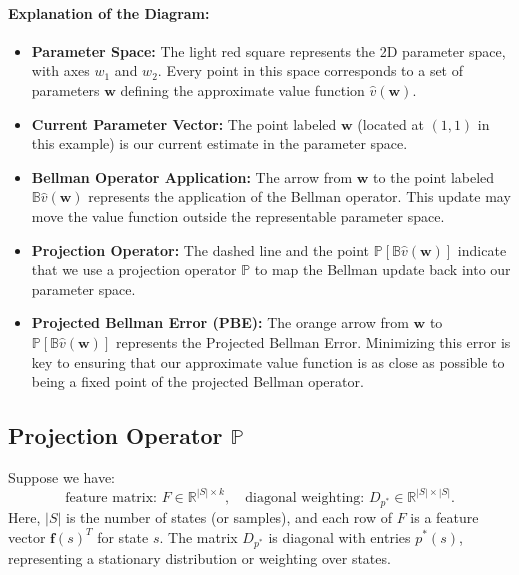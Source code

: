 \paragraph{Explanation of the Diagram:}
\begin{itemize}
    \item \textbf{Parameter Space:} The light red square represents the 2D parameter space, with axes $w_1$ and $w_2$. Every point in this space corresponds to a set of parameters $\mathbf{w}$ defining the approximate value function $\hat{v}(\mathbf{w})$.
    \item \textbf{Current Parameter Vector:} The point labeled $\mathbf{w}$ (located at $(1,1)$ in this example) is our current estimate in the parameter space.
    \item \textbf{Bellman Operator Application:} The arrow from $\mathbf{w}$ to the point labeled $\mathbb{B}\hat{v}(\mathbf{w})$ represents the application of the Bellman operator. This update may move the value function outside the representable parameter space.
    \item \textbf{Projection Operator:} The dashed line and the point $\mathbb{P}[\mathbb{B}\hat{v}(\mathbf{w})]$ indicate that we use a projection operator $\mathbb{P}$ to map the Bellman update back into our parameter space.
    \item \textbf{Projected Bellman Error (PBE):} The orange arrow from $\mathbf{w}$ to $\mathbb{P}[\mathbb{B}\hat{v}(\mathbf{w})]$ represents the Projected Bellman Error. Minimizing this error is key to ensuring that our approximate value function is as close as possible to being a fixed point of the projected Bellman operator.
\end{itemize}

\subsection{Projection Operator \texorpdfstring{$\mathbb{P}$}{P}}

Suppose we have:
\[
\text{feature matrix: } F \in \mathbb{R}^{|S|\times k}, 
\quad
\text{diagonal weighting: } D_{p^*} \in \mathbb{R}^{|S|\times |S|}.
\]
Here, $|S|$ is the number of states (or samples), and each row of $F$ is a feature vector $\boldsymbol{f}(s)^T$ for state $s$. The matrix $D_{p^*}$ is diagonal with entries $p^*(s)$, representing a stationary distribution or weighting over states.

